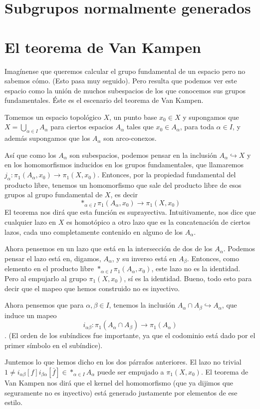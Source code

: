 \documentclass[spanish]{book}
\theoremstyle{definition}
\begin{document}
\section{Subgrupos normalmente generados}
\section{El teorema de Van Kampen}
	Imagínense que queremos calcular el grupo fundamental de un espacio pero no sabemos cómo. (Esto pasa muy seguido). Pero resulta que podemos ver este espacio como la unión de muchos subespacios de los que conocemos sus grupos fundamentales. Éste es el escenario del teorema de Van Kampen.

	Tomemos un espacio topológico $X$, un punto base $x_0\in X$ y supongamos que $X=\bigcup_{\alpha\in I}A_\alpha$ para ciertos espacios $A_\alpha$ tales que $x_0\in A_\alpha$, para toda $\alpha\in I$, y además supongamos que los $A_\alpha$ son arco-conexos.
	
	Así que como los $A_\alpha$ son subespacios, podemos pensar en la inclusión $A_\alpha\hookrightarrow X$ y en los homomorfismos inducidos en los grupos fundamentales, que llamaremos $j_\alpha:\pi_1(A_\alpha,x_0)\to\pi_1(X,x_0)$. Entonces, por la propiedad fundamental del producto libre, tenemos un homomorfismo que sale del producto libre de esos grupos al grupo fundamental de $X$, es decir
	\[\ast_{\alpha\in I}\pi_1(A_\alpha,x_0)\to\pi_1(X,x_0)\]
	El teorema nos dirá que esta función es suprayectiva. Intuitivamente, nos dice que cualquier lazo en $X$ es homotópico a otro lazo que es la concatenación de ciertos lazos, cada uno completamente contenido en alguno de los $A_\alpha$.
	
	Ahora pensemos en un lazo que está en la intersección de dos de los $A_\alpha$. Podemos pensar el lazo está en, digamos, $A_\alpha$, y su inverso está en $A_\beta$. Entonces, como elemento en el producto libre $\ast_{\alpha\in I}\pi_1(A_\alpha,x_0)$, este lazo no es la identidad. Pero al empujarlo al grupo $\pi_1(X,x_0)$, sí es la identidad. Bueno, todo esto para decir que el mapeo que hemos construido no es inyectivo.
	
	Ahora pensemos que para $\alpha,\beta\in I$, tenemos la inclusión $A_\alpha\cap A_\beta\hookrightarrow A_\alpha$, que induce un mapeo \[i_{\alpha\beta}:\pi_1(A_\alpha\cap A_\beta)\to \pi_1(A_\alpha)\]. (El orden de los subíndices fue importante, ya que el codominio está dado por el primer símbolo en el subíndice).
	
	Juntemos lo que hemos dicho en los dos párrafos anteriores. El lazo no trivial $1\neq i_{\alpha\beta}[f]i_{\beta\alpha}[\bar f]\in \ast_{\alpha\in I}A_\alpha$ puede ser empujado a $\pi_1(X,x_0)$. El teorema de Van Kampen nos dirá que el kernel del homomorfismo (que ya dijimos que seguramente no es inyectivo) está generado justamente por elementos de ese estilo.
	
\end{document}
